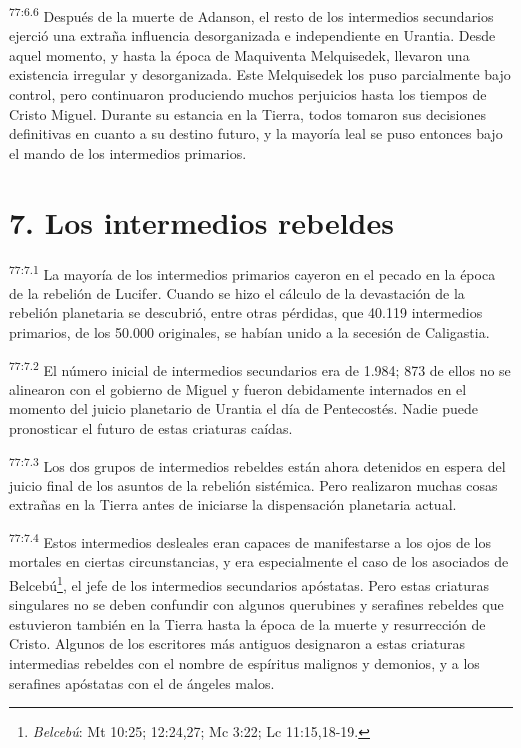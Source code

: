 \par
\textsuperscript{77:6.6} Después de la muerte de Adanson, el resto de los intermedios secundarios ejerció una extraña influencia desorganizada e independiente en Urantia. Desde aquel momento, y hasta la época de Maquiventa Melquisedek, llevaron una existencia irregular y desorganizada. Este Melquisedek los puso parcialmente bajo control, pero continuaron produciendo muchos perjuicios hasta los tiempos de Cristo Miguel. Durante su estancia en la Tierra, todos tomaron sus decisiones definitivas en cuanto a su destino futuro, y la mayoría leal se puso entonces bajo el mando de los intermedios primarios.

\section*{7. Los intermedios rebeldes}
\par
\textsuperscript{77:7.1} La mayoría de los intermedios primarios cayeron en el pecado en la época de la rebelión de Lucifer. Cuando se hizo el cálculo de la devastación de la rebelión planetaria se descubrió, entre otras pérdidas, que 40.119 intermedios primarios, de los 50.000 originales, se habían unido a la secesión de Caligastia.

\par
\textsuperscript{77:7.2} El número inicial de intermedios secundarios era de 1.984; 873 de ellos no se alinearon con el gobierno de Miguel y fueron debidamente internados en el momento del juicio planetario de Urantia el día de Pentecostés. Nadie puede pronosticar el futuro de estas criaturas caídas.

\par
\textsuperscript{77:7.3} Los dos grupos de intermedios rebeldes están ahora detenidos en espera del juicio final de los asuntos de la rebelión sistémica. Pero realizaron muchas cosas extrañas en la Tierra antes de iniciarse la dispensación planetaria actual.

\par
\textsuperscript{77:7.4} Estos intermedios desleales eran capaces de manifestarse a los ojos de los mortales en ciertas circunstancias, y era especialmente el caso de los asociados de Belcebú\footnote{\textit{Belcebú}: Mt 10:25; 12:24,27; Mc 3:22; Lc 11:15,18-19.}, el jefe de los intermedios secundarios apóstatas. Pero estas criaturas singulares no se deben confundir con algunos querubines y serafines rebeldes que estuvieron también en la Tierra hasta la época de la muerte y resurrección de Cristo. Algunos de los escritores más antiguos designaron a estas criaturas intermedias rebeldes con el nombre de espíritus malignos y demonios, y a los serafines apóstatas con el de ángeles malos.

